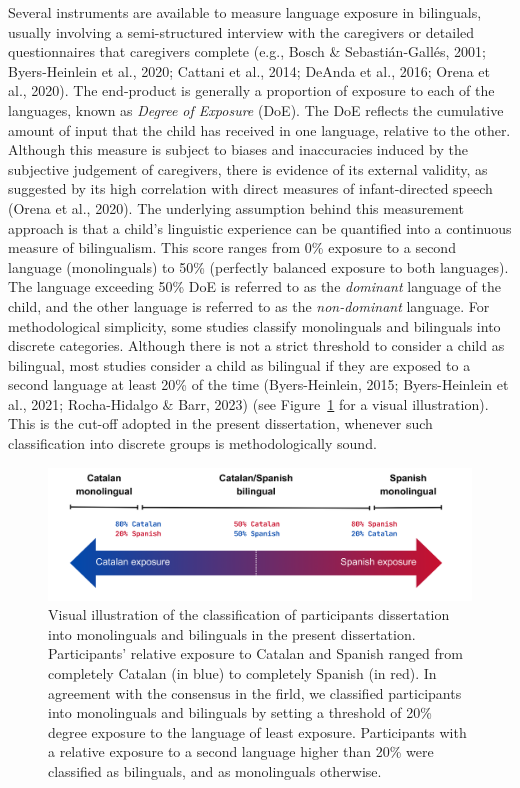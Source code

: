 \documentclass[
  12pt,
  b5paperpaper,
  twoside]{scrreprt}
\begin{document}
Several instruments are available to measure language exposure in
bilinguals, usually involving a semi-structured interview with the
caregivers or detailed questionnaires that caregivers complete (e.g.,
Bosch \& Sebastián-Gallés, 2001; Byers-Heinlein et al., 2020; Cattani et
al., 2014; DeAnda et al., 2016; Orena et al., 2020). The end-product is
generally a proportion of exposure to each of the languages, known as
\emph{Degree of Exposure} (DoE). The DoE reflects the cumulative amount
of input that the child has received in one language, relative to the
other. Although this measure is subject to biases and inaccuracies
induced by the subjective judgement of caregivers, there is evidence of
its external validity, as suggested by its high correlation with direct
measures of infant-directed speech (Orena et al., 2020). The underlying
assumption behind this measurement approach is that a child's linguistic
experience can be quantified into a continuous measure of bilingualism.
This score ranges from 0\% exposure to a second language (monolinguals)
to 50\% (perfectly balanced exposure to both languages). The language
exceeding 50\% DoE is referred to as the \emph{dominant} language of the
child, and the other language is referred to as the \emph{non-dominant}
language. For methodological simplicity, some studies classify
monolinguals and bilinguals into discrete categories. Although there is
not a strict threshold to consider a child as bilingual, most studies
consider a child as bilingual if they are exposed to a second language
at least 20\% of the time (Byers-Heinlein, 2015; Byers-Heinlein et al.,
2021; Rocha-Hidalgo \& Barr, 2023) (see Figure~\ref{fig-bilingualism}
for a visual illustration). This is the cut-off adopted in the present
dissertation, whenever such classification into discrete groups is
methodologically sound.

\begin{figure}

{\centering \includegraphics{chapters/../_assets/img/bilingualism.png}

}

\caption{\label{fig-bilingualism}Visual illustration of the
classification of participants dissertation into monolinguals and
bilinguals in the present dissertation. Participants' relative exposure
to Catalan and Spanish ranged from completely Catalan (in blue) to
completely Spanish (in red). In agreement with the consensus in the
firld, we classified participants into monolinguals and bilinguals by
setting a threshold of 20\% degree exposure to the language of least
exposure. Participants with a relative exposure to a second language
higher than 20\% were classified as bilinguals, and as monolinguals
otherwise.}

\end{figure}
\end{document}
